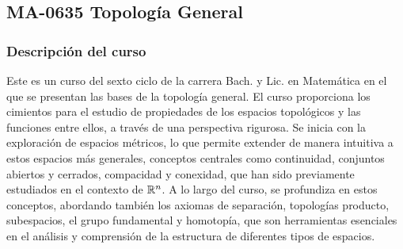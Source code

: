 \newpage
\subsection*{MA-0635 Topología General}

\hypertarget{MA0635}{}
\begin{refsection}
\begin{table}[H]
\end{table}



\subsubsection*{Descripción del curso}

Este es un curso del sexto ciclo de la carrera Bach. y Lic. en Matemática en el que se presentan las bases de la topología general. El curso proporciona los cimientos para el estudio de propiedades de los espacios topológicos y las funciones entre ellos, a través de una perspectiva rigurosa. Se inicia con la exploración de espacios métricos, lo que permite extender de manera intuitiva a estos espacios más generales, conceptos centrales como continuidad, conjuntos abiertos y cerrados, compacidad y conexidad, que han sido previamente estudiados en el contexto de $\mathbb{R}^n$. A lo largo del curso, se profundiza en estos conceptos, abordando también los axiomas de separación, topologías producto, subespacios, el grupo fundamental y homotopía, que son herramientas esenciales en el análisis y comprensión de la estructura de diferentes tipos de espacios.


\end{refsection}

